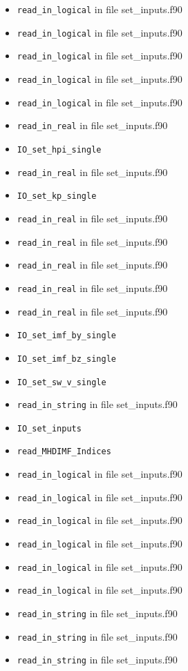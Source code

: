 \begin{itemize}
\begin{itemize}
    \item {\tt read\_in\_logical} in file set\_inputs.f90
    \item {\tt read\_in\_logical} in file set\_inputs.f90
    \item {\tt read\_in\_logical} in file set\_inputs.f90
    \item {\tt read\_in\_logical} in file set\_inputs.f90
    \item {\tt read\_in\_logical} in file set\_inputs.f90
    \item {\tt read\_in\_real} in file set\_inputs.f90
    \item {\tt IO\_set\_hpi\_single}
    \item {\tt read\_in\_real} in file set\_inputs.f90
    \item {\tt IO\_set\_kp\_single}
    \item {\tt read\_in\_real} in file set\_inputs.f90
    \item {\tt read\_in\_real} in file set\_inputs.f90
    \item {\tt read\_in\_real} in file set\_inputs.f90
    \item {\tt read\_in\_real} in file set\_inputs.f90
    \item {\tt read\_in\_real} in file set\_inputs.f90
    \item {\tt IO\_set\_imf\_by\_single}
    \item {\tt IO\_set\_imf\_bz\_single}
    \item {\tt IO\_set\_sw\_v\_single}
    \item {\tt read\_in\_string} in file set\_inputs.f90
    \item {\tt IO\_set\_inputs}
    \item {\tt read\_MHDIMF\_Indices}
    \item {\tt read\_in\_logical} in file set\_inputs.f90
    \item {\tt read\_in\_logical} in file set\_inputs.f90
    \item {\tt read\_in\_logical} in file set\_inputs.f90
    \item {\tt read\_in\_logical} in file set\_inputs.f90
    \item {\tt read\_in\_logical} in file set\_inputs.f90
    \item {\tt read\_in\_logical} in file set\_inputs.f90
    \item {\tt read\_in\_string} in file set\_inputs.f90
    \item {\tt read\_in\_string} in file set\_inputs.f90
    \item {\tt read\_in\_string} in file set\_inputs.f90

\end{itemize}
\end{itemize}
